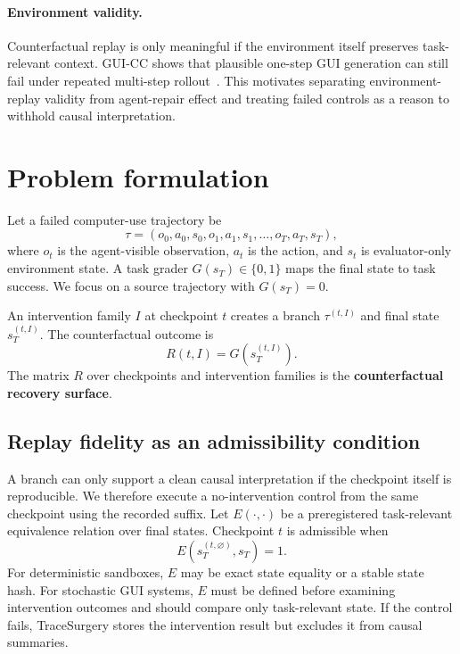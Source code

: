 \documentclass{article}
\begin{document}
\paragraph{Environment validity.}
Counterfactual replay is only meaningful if the environment itself preserves task-relevant context. GUI-CC shows that plausible one-step GUI generation can still fail under repeated multi-step rollout~\citep{fu2026guicc}. This motivates separating environment-replay validity from agent-repair effect and treating failed controls as a reason to withhold causal interpretation.

\section{Problem formulation}

Let a failed computer-use trajectory be
\begin{equation}
\tau = (o_0,a_0,s_0,o_1,a_1,s_1,\ldots,o_T,a_T,s_T),
\end{equation}
where $o_t$ is the agent-visible observation, $a_t$ is the action, and $s_t$ is evaluator-only environment state. A task grader $G(s_T)\in\{0,1\}$ maps the final state to task success. We focus on a source trajectory with $G(s_T)=0$.

An intervention family $I$ at checkpoint $t$ creates a branch $\tau^{(t,I)}$ and final state $s_T^{(t,I)}$. The counterfactual outcome is
\begin{equation}
R(t,I)=G\!\left(s_T^{(t,I)}\right).
\end{equation}
The matrix $R$ over checkpoints and intervention families is the \textbf{counterfactual recovery surface}.

\subsection{Replay fidelity as an admissibility condition}
A branch can only support a clean causal interpretation if the checkpoint itself is reproducible. We therefore execute a no-intervention control from the same checkpoint using the recorded suffix. Let $E(\cdot,\cdot)$ be a preregistered task-relevant equivalence relation over final states. Checkpoint $t$ is admissible when
\begin{equation}
E\!\left(s_T^{(t,\varnothing)}, s_T\right)=1.
\end{equation}
For deterministic sandboxes, $E$ may be exact state equality or a stable state hash. For stochastic GUI systems, $E$ must be defined before examining intervention outcomes and should compare only task-relevant state. If the control fails, TraceSurgery stores the intervention result but excludes it from causal summaries.
\end{document}
